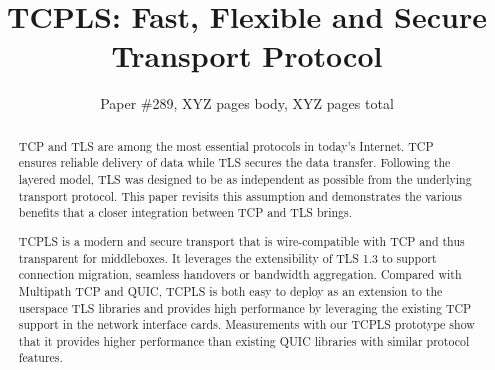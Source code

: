\documentclass[sigconf]{acmart}
\begin{document}
\title{TCPLS: Fast, Flexible and Secure Transport Protocol}

\author{Paper \#289, XYZ pages body, XYZ pages total}

\renewcommand{\shortauthors}{X.et al.}


\begin{abstract}
  TCP and TLS are among the most essential protocols in today's Internet. TCP ensures reliable delivery of data while TLS secures the data transfer. Following the layered model, TLS was designed to be as independent as possible from the underlying transport protocol. This paper revisits this assumption and demonstrates the various benefits that a closer integration between TCP and TLS brings.

  TCPLS is a modern and secure transport that is wire-compatible with TCP and thus transparent for middleboxes. It leverages the extensibility of TLS 1.3 to support connection migration, seamless handovers or bandwidth aggregation. Compared with Multipath TCP and QUIC, TCPLS is both easy to deploy as an extension to the userspace TLS libraries and provides high performance by leveraging the existing TCP support in the network interface cards. Measurements with our TCPLS prototype show that it provides higher performance than existing QUIC libraries with similar protocol features.

\end{abstract}
\maketitle





\end{document}
